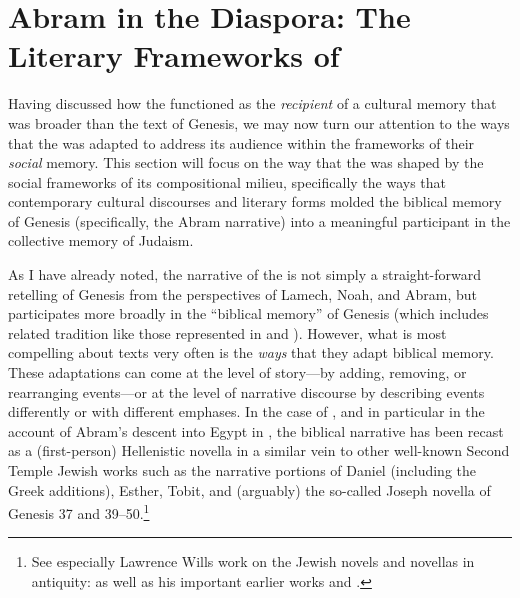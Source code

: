 
\section{Abram in the Diaspora: The Literary Frameworks of \GA}

Having discussed how the \ga functioned as the \emph{recipient} of a cultural memory that was broader than the text of Genesis, we may now turn our attention to the ways that the \ga was adapted to address its audience within the frameworks of their \emph{social} memory. This section will focus on the way that the \ga was shaped by the social frameworks of its compositional milieu, specifically the ways that contemporary cultural discourses and literary forms molded the biblical memory of Genesis (specifically, the Abram narrative) into a meaningful participant in the collective memory of \secondtemple Judaism.

As I have already noted, the narrative of the \ga is not simply a straight-forward retelling of Genesis from the perspectives of Lamech, Noah, and Abram, but participates more broadly in the ``biblical memory'' of Genesis (which includes related tradition like those represented in \firstenoch and \jub). However, what is most compelling about \rwb texts very often is the \emph{ways} that they adapt biblical memory. These adaptations can come at the level of story---by adding, removing, or rearranging events---or at the level of narrative discourse by describing events differently or with different emphases. In the case of \ga, and in particular in the account of Abram's descent into Egypt in , the biblical narrative has been recast as a (first-person) Hellenistic novella in a similar vein to other well-known Second Temple Jewish works such as the narrative portions of Daniel (including the Greek additions), Esther, Tobit, and (arguably) the so-called Joseph novella of Genesis 37 and 39--50.\footnote{See especially Lawrence Wills work on the Jewish novels and novellas in antiquity: \cite*{wills2002} as well as his important earlier works \cite*{wills1995} and \cite{wills1990}.}






